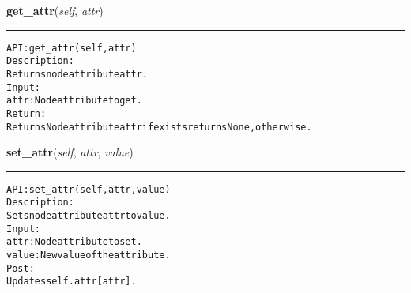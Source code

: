     \label{coinor:gimpy:graph:Node:get_attr}

    \vspace{0.5ex}

\hspace{.8\funcindent}\begin{boxedminipage}{\funcwidth}

    \raggedright \textbf{get\_attr}(\textit{self}, \textit{attr})

    \vspace{-1.5ex}

    \rule{\textwidth}{0.5\fboxrule}
\setlength{\parskip}{2ex}
\begin{alltt}

API: get\_attr(self, attr)
Description:
Returns node attribute attr.
Input:
    attr: Node attribute to get.
Return:
    Returns Node attribute attr if exists returns None, otherwise.
\end{alltt}

\setlength{\parskip}{1ex}
    \end{boxedminipage}

    \label{coinor:gimpy:graph:Node:set_attr}

    \vspace{0.5ex}

\hspace{.8\funcindent}\begin{boxedminipage}{\funcwidth}

    \raggedright \textbf{set\_attr}(\textit{self}, \textit{attr}, \textit{value})

    \vspace{-1.5ex}

    \rule{\textwidth}{0.5\fboxrule}
\setlength{\parskip}{2ex}
\begin{alltt}

API: set\_attr(self, attr, value)
Description:
Sets node attribute attr to value.
Input:
    attr: Node attribute to set.
    value: New value of the attribute.
Post:
    Updates self.attr[attr].
\end{alltt}

\setlength{\parskip}{1ex}
    \end{boxedminipage}


